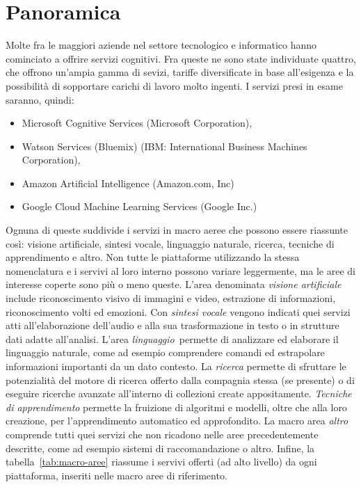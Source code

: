 
\section{Panoramica}\label{sec:panoramica}
Molte fra le maggiori aziende nel settore tecnologico e informatico hanno cominciato a offrire servizi cognitivi.
%
Fra queste ne sono state individuate quattro, che offrono un'ampia gamma di sevizi, tariffe diversificate in base all'esigenza e la possibilità di sopportare carichi di lavoro molto ingenti.
I servizi presi in esame saranno, quindi:
\begin{itemize}
\item Microsoft Cognitive Services \cite{microsoft-link} (Microsoft Corporation),
\item Watson Services (Bluemix) \cite{ibm-link} (IBM: International Business Machines Corporation),
\item Amazon Artificial Intelligence \cite{amazon-link} (Amazon.com, Inc)
\item Google Cloud Machine Learning Services \cite{google-link} (Google Inc.)
\end{itemize}

Ognuna di queste suddivide i servizi in macro aeree che possono essere riassunte così: visione artificiale, sintesi vocale, linguaggio naturale, ricerca, tecniche di apprendimento e altro.
Non tutte le piattaforme utilizzando la stessa nomenclatura e i servivi al loro interno possono variare leggermente, ma le aree di interesse coperte sono più o meno queste.
L'area denominata \textit{visione artificiale} include riconoscimento visivo di immagini e video, estrazione di informazioni, riconoscimento volti ed emozioni.
Con \textit{sintesi vocale} vengono indicati quei servizi atti all'elaborazione dell'audio e alla sua trasformazione in testo o in strutture dati adatte all'analisi.
L'area \textit{linguaggio} permette di analizzare ed elaborare il linguaggio naturale, come ad esempio comprendere comandi ed estrapolare informazioni importanti da un dato contesto.
La \textit{ricerca} permette di sfruttare le potenzialità del motore di ricerca offerto dalla compagnia stessa (se presente) o di eseguire ricerche avanzate all'interno di collezioni create appositamente.
\textit{Tecniche di apprendimento} permette la fruizione di algoritmi e modelli, oltre che alla loro creazione, per l'apprendimento automatico ed approfondito.
La macro area \textit{altro} comprende tutti quei servizi che non ricadono nelle aree precedentemente descritte, come ad esempio sistemi di raccomandazione o altro.
Infine, la tabella~\ref{tab:macro-aree} riassume i servivi offerti (ad alto livello) da ogni piattaforma, inseriti nelle macro aree di riferimento.

